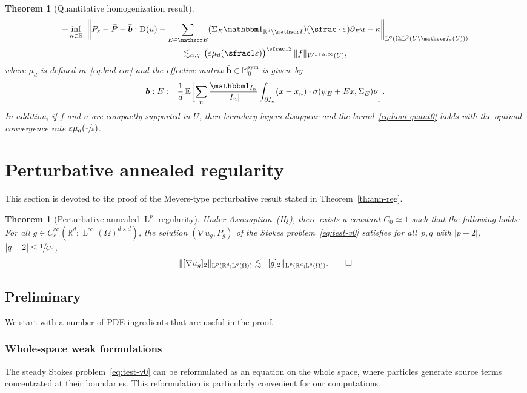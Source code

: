 \documentclass[10pt]{amsart}
\let\mathcal\mathscr
\newcommand{\Hd}{\hyperref[Hd]{\textup{(H$_\delta$)}}\xspace}
\let\mathds\mathbbm
\theoremstyle{plain}
\newtheorem{theor1}{Theorem}
\newtheorem{theor}{Theorem}[section]
\theoremstyle{definition}
\newcommand{\e}{\varepsilon}
\newcommand{\Ec}{\mathcal E}
\newcommand{\R}{\mathbb R}
\newcommand{\Ic}{\mathcal I}
\newcommand{\Md}{\mathbb M}
\newcommand{\D}{\operatorname{D}}
\newcommand{\bb}{\bar{\boldsymbol b}}
\newcommand{\Ld}{\operatorname{L}}
\newcommand{\Sym}{{\operatorname{sym}}}
\newcommand{\expecM}[1]{\mathbb{E}\biggl[ #1 \biggr]}
\begin{document}
\begin{theor1}[Quantitative homogenization result]
\begin{multline}
+\inf_{\kappa\in\R}~\bigg\|P_\e-\bar P-\bb:\D(\bar u)
-\sum_{E\in\Ec}(\Sigma_E\mathds1_{\R^d\setminus\Ic})(\sfrac\cdot\e)\partial_E\bar u-\kappa\bigg\|_{\Ld^q(\Omega;\Ld^2(U\setminus\Ic_\e(U)))}\\
\lesssim_{\alpha,q}\,
\big(\e\mu_d(\sfrac1\e)\big)^{\sfrac12}\,\|f\|_{W^{1+\alpha,\infty}(U)},
\end{multline}
where $\mu_d$ is defined in~\eqref{eq:bnd-cor}
and the effective matrix $\bb\in\Md_0^\Sym$ is given~by
\begin{equation}\label{eq:def-b}
\bb:E:= \frac1d\,\expecM{\sum_n\frac{\mathds1_{I_n}}{|I_n|}\int_{\partial I_n}(x-x_n)\cdot\sigma(\psi_E+Ex,\Sigma_E)\nu}.
\end{equation}
In addition, if $f$ and $\bar u$ are compactly supported in $U$, then boundary layers disappear and the bound~\eqref{eq:hom-quant0} holds with the optimal convergence rate $\e\mu_d(\sfrac1\e)$.
\end{theor1}


\section{Perturbative annealed regularity}\label{sec:Meyers}

This section is devoted to the proof of the Meyers-type perturbative result stated in Theorem~\ref{th:ann-reg}.

\begin{samepage}
\begin{theor}[Perturbative annealed $\Ld^p$ regularity]\label{th:meyers-ann}
Under Assumption~\Hd, there exists a constant $C_0\simeq1$ such that the following holds:
For all $g\in C^\infty_c(\R^d;\Ld^\infty(\Omega)^{d\times d})$, the solution $(\nabla u_g,P_g)$ of the Stokes problem~\eqref{eq:test-v0} satisfies for all~$p,q$ with $|p-2|$, $|q-2|\le\sfrac1{C_0}$,
\[\|[\nabla u_g]_2\|_{\Ld^p(\R^d;\Ld^q(\Omega))}\lesssim \|[g]_2\|_{\Ld^p(\R^d;\Ld^q(\Omega))}.\qedhere\]
\end{theor}
\end{samepage}

\subsection{Preliminary}
We start with a number of PDE ingredients that are useful in the proof.

\vspace{-0.3cm}
\subsubsection{Whole-space weak formulations}
The steady Stokes problem~\eqref{eq:test-v0} can be reformulated as an equation on the whole space, where particles generate source terms concentrated at their boundaries. This reformulation is particularly convenient for our computations.
\end{document}
